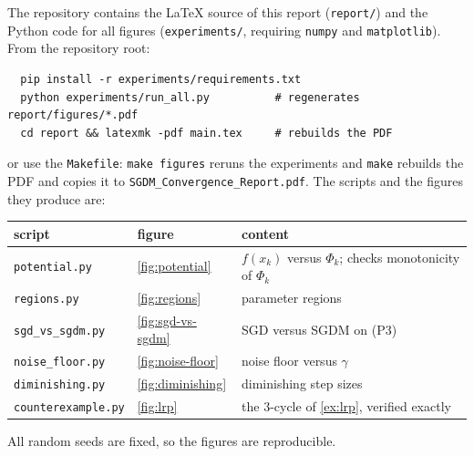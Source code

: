 The repository contains the \LaTeX{} source of this report (\texttt{report/}) and the
Python code for all figures (\texttt{experiments/}, requiring \texttt{numpy} and
\texttt{matplotlib}). From the repository root:
\begin{verbatim}
  pip install -r experiments/requirements.txt
  python experiments/run_all.py          # regenerates report/figures/*.pdf
  cd report && latexmk -pdf main.tex     # rebuilds the PDF
\end{verbatim}
or use the \texttt{Makefile}: \texttt{make figures} reruns the experiments and
\texttt{make} rebuilds the PDF and copies it to \texttt{SGDM\_Convergence\_Report.pdf}.
The scripts and the figures they produce are:
\begin{center}\small
\begin{tabular}{@{}lll@{}}
\toprule
script & figure & content\\
\midrule
\texttt{potential.py} & \cref{fig:potential} & $f(x_k)$ versus $\Phi_k$; checks monotonicity of $\Phi_k$\\
\texttt{regions.py} & \cref{fig:regions} & parameter regions\\
\texttt{sgd\_vs\_sgdm.py} & \cref{fig:sgd-vs-sgdm} & SGD versus SGDM on (P3)\\
\texttt{noise\_floor.py} & \cref{fig:noise-floor} & noise floor versus $\gamma$\\
\texttt{diminishing.py} & \cref{fig:diminishing} & diminishing step sizes\\
\texttt{counterexample.py} & \cref{fig:lrp} & the $3$-cycle of \cref{ex:lrp}, verified exactly\\
\bottomrule
\end{tabular}
\end{center}
All random seeds are fixed, so the figures are reproducible.
